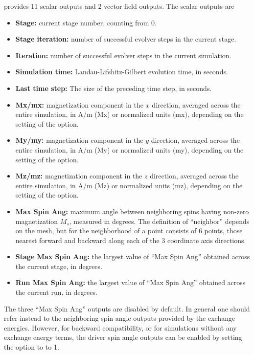 \begin{description}
 provides 11 scalar outputs and 2 vector field
outputs.  The scalar outputs are
\begin{itemize}
\item \textbf{Stage:} current stage number, counting from 0.
\item \textbf{Stage iteration:} number of successful evolver steps
in the current stage.
\item \textbf{Iteration:} number of successful evolver steps in the
current simulation.
\item \textbf{Simulation time:} Landau-Lifshitz-Gilbert evolution
time, in seconds.
\item \textbf{Last time step:} The size of the preceding time step, in
seconds.
\item \textbf{Mx/mx:} magnetization component in the $x$ direction,
averaged across the entire simulation, in A/m (Mx) or normalized units
(mx), depending on the setting of the 
option.
\item \textbf{My/my:} magnetization component in the $y$ direction,
averaged across the entire simulation, in A/m (My) or normalized units
(my), depending on the setting of the 
option.
\item \textbf{Mz/mz:} magnetization component in the $z$ direction,
averaged across the entire simulation, in A/m (Mz) or normalized units
(mz), depending on the setting of the 
option.
\item \textbf{Max Spin Ang:} maximum angle between neighboring spins
having non-zero magnetization $M_s$, measured in degrees.  The definition
of ``neighbor'' depends on the mesh, but for 
the neighborhood of a point consists of 6 points, those nearest
forward and backward along each of the 3 coordinate axis directions.
\item \textbf{Stage Max Spin Ang:} the largest value of ``Max Spin
Ang'' obtained across the current stage, in degrees.
\item \textbf{Run Max Spin Ang:} the largest value of ``Max Spin
Ang'' obtained across the current run, in degrees.
\end{itemize}
The three ``Max Spin Ang'' outputs are disabled by default.  In general
one should refer instead to the neighboring spin angle outputs provided
by the exchange energies.  However, for backward compatibility, or for
simulations without any exchange energy terms, the driver spin angle
outputs can be enabled by setting the
 option to to 1.


\end{description}
